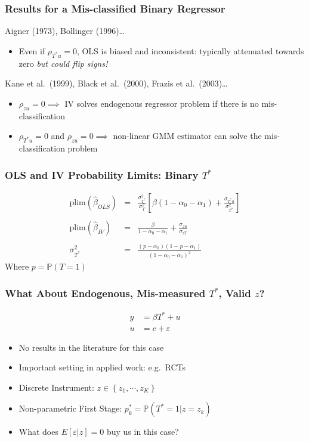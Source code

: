 \documentclass{beamer}
\begin{document}
\begin{frame}
  \frametitle{Results for a Mis-classified Binary Regressor}
  \begin{block}{Aigner (1973), Bollinger (1996)\ldots}
    \begin{itemize}
      \item Even if $\rho_{T^*u}=0$, OLS is biased and inconsistent: typically attenuated towards zero \emph{but could flip signs!} 
    \end{itemize}
  \end{block}
  \begin{block}{Kane et al.\ (1999), Black et al.\ (2000), Frazis et al.\ (2003)\ldots}
    \begin{itemize}
      \item $\rho_{zu}=0 \implies$ IV solves endogenous regressor problem if there is no mis-classification
      \item $\rho_{T^*u}=0$ and $\rho_{zu}=0 \implies$ non-linear GMM estimator can solve the mis-classification problem
    \end{itemize}
  \end{block}
\end{frame}
\begin{frame}
  \frametitle{OLS and IV Probability Limits: Binary $T^*$}
  \small
  \begin{eqnarray*}
    \mbox{plim}\left(\widehat{\beta}_{OLS} \right) &=& \frac{\sigma_{T^*}^2}{\sigma_T^2}\left[\beta \left( 1 - \alpha_0 - \alpha_1 \right) + \frac{\sigma_{T^*u}}{\sigma_{T^*}^2}\right]\\ \\
    \mbox{plim}\left( \widehat{\beta}_{IV} \right) &=& \frac{\beta}{1 - \alpha_0 - \alpha_1} + \frac{\sigma_{zu}}{\sigma_{zT}}\\ \\ 
    \sigma_{T^*}^2 &=& \frac{\left( p - \alpha_0\right)\left( 1 - p - \alpha_1 \right)}{\left(1 -\alpha_0 - \alpha_1\right)^2}
  \end{eqnarray*}
  Where $p = \mathbb{P}(T=1)$
 
\end{frame}
\begin{frame}
  \frametitle{What About Endogenous, Mis-measured $T^*$, Valid $z$?}
\begin{align*}
 y &= \beta T^* + u\\
u &= c + \varepsilon
\end{align*}

  \begin{itemize}
    \item No results in the literature for this case
    \item Important setting in applied work: e.g.\ RCTs
    \item Discrete Instrument: $z \in \left\{ z_1, \cdots, z_K \right\}$
    \item Non-parametric First Stage: $p_k^* = \mathbb{P}(T^*=1|z = z_k)$
    \item What does $E[\varepsilon|z]=0$ buy us in this case?
  \end{itemize}
\end{frame}
\end{document}
